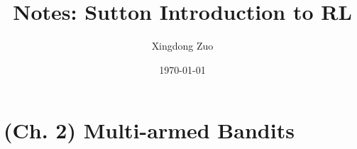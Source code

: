 \documentclass{article}
\title{Notes: Sutton Introduction to RL}
\author{Xingdong Zuo}
\affil[]{IDSIA, Switzerland}
\date{\today}
\begin{document}
\maketitle

\section{(Ch. 2) Multi-armed Bandits}



\printbibliography
\end{document}

